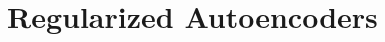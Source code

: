 \documentclass{article}
\begin{document}
    
    
    




\section{Regularized Autoencoders}
\end{document}
